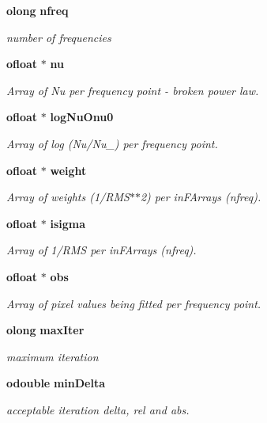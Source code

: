 \begin{CompactItemize}
{\bf olong} {\bf nfreq}
\begin{CompactList}\small\item\em number of frequencies \item\end{CompactList}\item 
{\bf ofloat} $\ast$ {\bf nu}
\begin{CompactList}\small\item\em Array of Nu per frequency point - broken power law. \item\end{CompactList}\item 
{\bf ofloat} $\ast$ {\bf log\-Nu\-Onu0}
\begin{CompactList}\small\item\em Array of log (Nu/Nu\_) per frequency point. \item\end{CompactList}\item 
{\bf ofloat} $\ast$ {\bf weight}
\begin{CompactList}\small\item\em Array of weights (1/RMS$\ast$$\ast$2) per in\-FArrays (nfreq). \item\end{CompactList}\item 
{\bf ofloat} $\ast$ {\bf isigma}
\begin{CompactList}\small\item\em Array of 1/RMS per in\-FArrays (nfreq). \item\end{CompactList}\item 
{\bf ofloat} $\ast$ {\bf obs}
\begin{CompactList}\small\item\em Array of pixel values being fitted per frequency point. \item\end{CompactList}\item 
{\bf olong} {\bf max\-Iter}
\begin{CompactList}\small\item\em maximum iteration \item\end{CompactList}\item 
{\bf odouble} {\bf min\-Delta}
\begin{CompactList}\small\item\em acceptable iteration delta, rel and abs. \item\end{CompactList}\item 

\end{CompactItemize}
